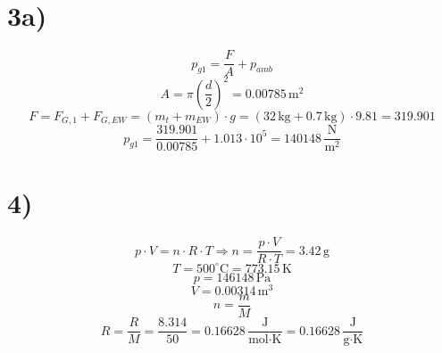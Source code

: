 

\section*{3a)}
\begin{equation*}
    p_{g1} = \frac{F}{A} + p_{amb}
\end{equation*}
\begin{equation*}
    A = \pi \left( \frac{d}{2} \right)^2 = 0.00785 \, \text{m}^2
\end{equation*}
\begin{equation*}
    F = F_{G,1} + F_{G,EW} = (m_t + m_{EW}) \cdot g = (32 \, \text{kg} + 0.7 \, \text{kg}) \cdot 9.81 = 319.901
\end{equation*}
\begin{equation*}
    p_{g1} = \frac{319.901}{0.00785} + 1.013 \cdot 10^5 = 140148 \, \frac{\text{N}}{\text{m}^2}
\end{equation*}

\section*{4)}
\begin{equation*}
    p \cdot V = n \cdot R \cdot T \Rightarrow n = \frac{p \cdot V}{R \cdot T} = 3.42 \, \text{g}
\end{equation*}
\begin{equation*}
    T = 500^\circ \text{C} = 773.15 \, \text{K}
\end{equation*}
\begin{equation*}
    p = 146148 \, \text{Pa}
\end{equation*}
\begin{equation*}
    V = 0.00314 \, \text{m}^3
\end{equation*}
\begin{equation*}
    n = \frac{m}{M}
\end{equation*}
\begin{equation*}
    R = \frac{R}{M} = \frac{8.314}{50} = 0.16628 \, \frac{\text{J}}{\text{mol} \cdot \text{K}} = 0.16628 \, \frac{\text{J}}{\text{g} \cdot \text{K}}
\end{equation*}

